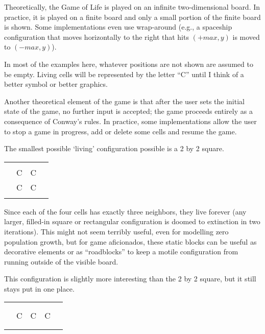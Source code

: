 \documentclass[12pt]{article}
\begin{document}

Theoretically, the Game of Life is played on an infinite two-dimensional board. In practice, it is played on a finite board and only a small portion of the finite board is shown. Some implementations even use wrap-around (e.g., a spaceship configuration that moves horizontally to the right that hits $(+max, y)$ is moved to $(-max, y)$).

In most of the examples here, whatever positions are not shown are assumed to be empty. Living cells will be represented by the letter ``C'' until I think of a better symbol or better graphics.

Another theoretical element of the game is that after the user sets the initial state of the game, no further input is accepted; the game proceeds entirely as a consequence of Conway's rules. In practice, some implementations allow the user to stop a game in progress, add or delete some cells and resume the game.

The smallest possible `living' configuration possible is a 2 by 2 square.

\begin{tabular}{|c|l|l|l|}
 & & & \\
 & C & C & \\
 & C & C & \\
 & & & \\
\end{tabular}

Since each of the four cells has exactly three neighbors, they live forever (any larger, filled-in square or rectangular configuration is doomed to extinction in two iterations). This might not seem terribly useful, even for modelling zero population growth, but for game aficionados, these static blocks can be useful as decorative elements or as ``roadblocks'' to keep a motile configuration from running outside of the visible board.

This configuration is slightly more interesting than the 2 by 2 square, but it still stays put in one place.

\begin{tabular}{|c|l|l|l|l|}
 & & & & \\
 & & & & \\
 & C & C & C & \\
 & & & & \\
 & & & & \\
\end{tabular}
\end{document}
